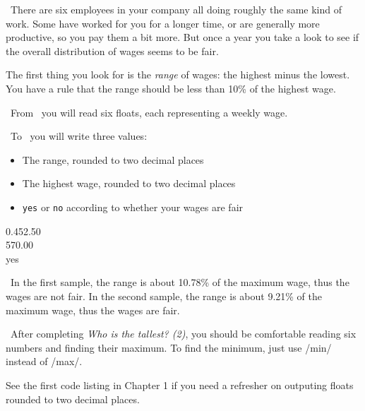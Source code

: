 

\Question\ There are six employees in your company all doing roughly the same kind of
work. Some have worked for you for a longer time, or are generally more productive, so you
pay them a bit more. But once a year you take a look to see if the overall distribution of
wages seems to be fair.

The first thing you look for is the \emph{range} of wages: the highest minus the lowest.
You have a rule that the range should be less than 10\% of the highest wage.

\Input\ From \IN\ you will read six floats, each representing a weekly wage.

\Output\ To \OUT\ you will write three values:
\begin{itemize}
  \item The range, rounded to two decimal places
  \item The highest wage, rounded to two decimal places
  \item \texttt{yes} or \texttt{no} according to whether your wages are fair
\end{itemize}

\Sample

             {
                     {0.4}{52.50\\570.00\\yes}}

\Explanation\ In the first sample, the range is about 10.78\% of the maximum wage, thus
the wages are not fair. In the second sample, the range is about 9.21\% of the maximum
wage, thus the wages are fair.

\Scratch\ After completing \emph{Who is the tallest? (2)}, you should be comfortable
reading six numbers and finding their maximum. To find the minimum, just use \pycode/min/
instead of \pycode/max/.

See the first code listing in Chapter 1 if you need a refresher on outputing floats
rounded to two decimal places.

